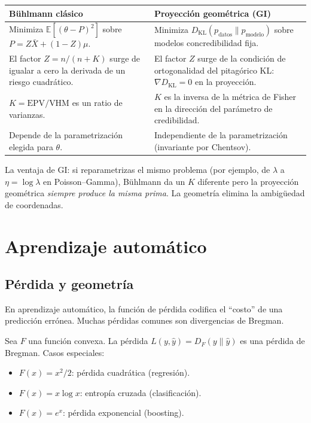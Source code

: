 \begin{center}
	\renewcommand{\arraystretch}{1.3}
	\begin{tabular}{|p{5.5cm}|p{5.5cm}|}
		\hline
		\textbf{Bühlmann clásico} & \textbf{Proyección geométrica (GI)} \\
		\hline
		Minimiza $\mathbb{E}[(\theta - P)^2]$ sobre $P = Z\bar{X} + (1-Z)\mu$. & Minimiza $D_{\mathrm{KL}}(p_{\text{datos}} \| p_{\text{modelo}})$ sobre modelos concredibilidad fija. \\
		\hline
		El factor $Z = n/(n+K)$ surge de igualar a cero la derivada de un riesgo cuadrático. & El factor $Z$ surge de la condición de ortogonalidad del pitagórico KL: $\nabla D_{\mathrm{KL}} = 0$ en la proyección. \\
		\hline
		$K = \text{EPV}/\text{VHM}$ es un ratio de varianzas. & $K$ es la inversa de la métrica de Fisher en la dirección del parámetro de credibilidad. \\
		\hline
		Depende de la parametrización elegida para $\theta$. & Independiente de la parametrización (invariante por Chentsov). \\
		\hline
	\end{tabular}
\end{center}

\noindent La ventaja de GI: si reparametrizas el mismo problema (por ejemplo, de $\lambda$ a $\eta = \log\lambda$ en Poisson--Gamma), Bühlmann da un $K$ diferente pero la proyección geométrica \emph{siempre produce la misma prima}.  La geometría elimina la ambigüedad de coordenadas.

\section{Aprendizaje automático}

\subsection{Pérdida y geometría}

En aprendizaje automático, la función de pérdida codifica el ``costo'' de una predicción errónea.  Muchas pérdidas comunes son divergencias de Bregman.

\begin{theorem}
	Sea $F$ una función convexa.  La pérdida $L(y, \hat{y}) = D_F(y \| \hat{y})$ es una pérdida de Bregman.  Casos especiales:
	\begin{itemize}
		\item $F(x) = x^2/2$: pérdida cuadrática (regresión).
		\item $F(x) = x\log x$: entropía cruzada (clasificación).
		\item $F(x) = e^x$: pérdida exponencial (boosting).
	\end{itemize}
\end{theorem}


